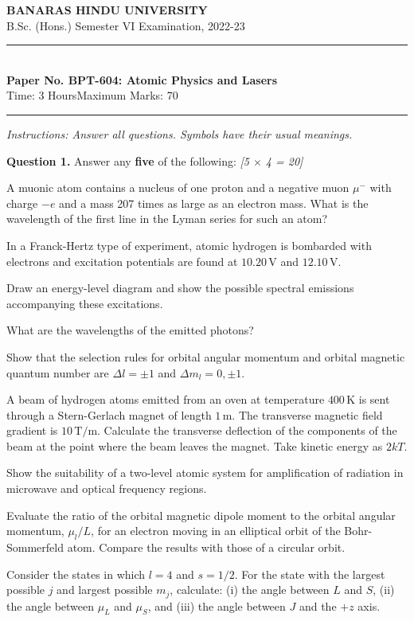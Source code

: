 \documentclass[11pt,a4paper]{article}
\newcommand{\pts}[1]{\hfill   \textit{[#1]}}
\begin{document}
\begin{center}
  {\large\bfseries BANARAS HINDU UNIVERSITY}\\[2pt]
  {\normalsize B.Sc. (Hons.) Semester VI Examination, 2022-23}\\[6pt]
  \rule{0.8\linewidth}{0.5pt}\\[6pt]
  {\large\bfseries Paper No. BPT-604: Atomic Physics and Lasers}\\[4pt]
  {\normalsize Time: 3 Hours\hfill Maximum Marks: 70}
\end{center}
\rule{\linewidth}{0.4pt}
\smallskip



\noindent   \textit{Instructions: Answer all questions. Symbols have their usual meanings.}
\bigskip




\noindent   \textbf{Question 1.} Answer any   \textbf{five} of the following: \pts{5 $ \times$ 4 = 20}

\begin{parts}
  \item A muonic atom contains a nucleus of one proton and a negative muon $\mu^-$ with charge $-e$ and a mass 207 times as large as an electron mass. What is the wavelength of the first line in the Lyman series for such an atom?
  \item In a Franck-Hertz type of experiment, atomic hydrogen is bombarded with electrons and excitation potentials are found at $10.20\, \text{V}$ and $12.10\, \text{V}$.
    
\begin{parts}
      \item Draw an energy-level diagram and show the possible spectral emissions accompanying these excitations.
      \item What are the wavelengths of the emitted photons?
    \end{parts}
  \item Show that the selection rules for orbital angular momentum and orbital magnetic quantum number are $\Delta l = \pm 1$ and $\Delta m_l = 0, \pm 1$.
  \item A beam of hydrogen atoms emitted from an oven at temperature $400\, \text{K}$ is sent through a Stern-Gerlach magnet of length $1\, \text{m}$. The transverse magnetic field gradient is $10\, \text{T/m}$. Calculate the transverse deflection of the components of the beam at the point where the beam leaves the magnet. Take kinetic energy as $2kT$.
  \item Show the suitability of a two-level atomic system for amplification of radiation in microwave and optical frequency regions.
  \item Evaluate the ratio of the orbital magnetic dipole moment to the orbital angular momentum, $\mu_l/L$, for an electron moving in an elliptical orbit of the Bohr-Sommerfeld atom. Compare the results with those of a circular orbit.
  \item Consider the states in which $l = 4$ and $s = 1/2$. For the state with the largest possible $j$ and largest possible $m_j$, calculate: (i) the angle between $L$ and $S$, (ii) the angle between $\mu_L$ and $\mu_S$, and (iii) the angle between $J$ and the $+z$ axis.
\end{parts}
\end{document}
